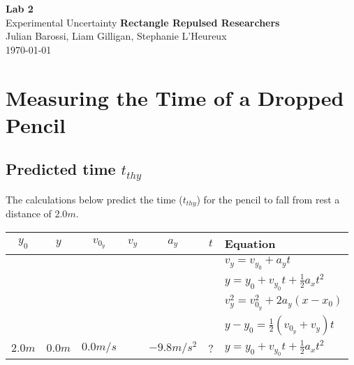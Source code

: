 \documentclass[11pt, letterpaper, includehead]{article}
\begin{document}
  \begin{titlepage} 
    \begin{center}
      \Huge{\textbf{Lab 2}}\\
      \Huge{Experimental Uncertainty}
      \vfill
      \large{\textbf{Rectangle Repulsed Researchers}}\\
      \large{Julian Barossi, Liam Gilligan, Stephanie L'Heureux}\\
      \vspace{0.5cm}
      \normalsize
      \today
    \end{center}
  \end{titlepage}

  \tableofcontents
  \pagebreak %


  \pagestyle{fancy}
  \fancyhead{}

  \section{Measuring the Time of a Dropped Pencil} %
  
  \subsection{Predicted time $t_{thy}$} %
  The calculations below predict the time ($t_{thy}$) for the pencil to 
  fall from rest a distance of $2.0m$.
  
  \hspace*{0.25cm}
  \begin{tabular}{| c | c | c | c | c | c | l |} 
    \hline
    $y_0$ & $y$  & $v_{0_y}$ & $v_{y}$ & $a_y$ & $t$ & Equation \\ 
    \hline \hline
    \color{red}{$\times$} & \color{LimeGreen}{\checkmark} & \color{LimeGreen}{\checkmark} & \color{LimeGreen}{\checkmark} & \color{LimeGreen}{\checkmark} & \color{LimeGreen}{\checkmark} & $v_y = v_{y_0} + a_yt$ \\ 
    \hline
    \color{LimeGreen}{\checkmark} & \color{LimeGreen}{\checkmark} & \color{LimeGreen}{\checkmark} & \color{red}{$\times$} & \color{LimeGreen}{\checkmark} & \color{LimeGreen}{\checkmark} & $y = y_0 + v_{y_0}t + \frac{1}{2}a_xt^2$\\ 
    \hline
    \color{LimeGreen}{\checkmark} & \color{LimeGreen}{\checkmark} & \color{LimeGreen}{\checkmark} & \color{LimeGreen}{\checkmark} & \color{LimeGreen}{\checkmark} & \color{red}{$\times$} & $v_y^2 = v^2_{0_y} + 2a_y(x - x_0)$\\
    \hline
    \color{LimeGreen}{\checkmark} & \color{LimeGreen}{\checkmark} & \color{LimeGreen}{\checkmark} &  \color{LimeGreen}{\checkmark} &  \color{red}{$\times$} & \color{LimeGreen}{\checkmark} & $y - y_0 = \frac{1}{2}(v_{0_y} + v_y)t$\\
    \hline\hline
    $2.0m$ & $0.0m$ & $0.0m/s$ &  & $-9.8m/s^2$ & ? & $y = y_0 + v_{y_0}t + \frac{1}{2}a_xt^2$ \\
    \hline
  \end{tabular}
\end{document}

